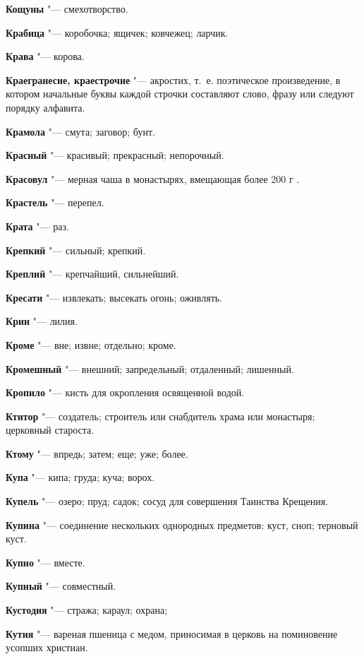 \begin{mymulticols}
\noindent\textbf{Кощуны} "--- смехотворство. 

\noindent\textbf{Крабица} "--- коробочка; ящичек; ковчежец; ларчик. 

\noindent\textbf{Крава} "--- корова. 

\noindent\textbf{Краегранесие, краестрочие} "--- акростих, т.~е. поэтическое произведение, в котором начальные буквы каждой строчки составляют слово, фразу или следуют порядку алфавита. 

\noindent\textbf{Крамола} "--- смута; заговор; бунт. 

\noindent\textbf{Красный} "--- красивый; прекрасный; непорочный. 

\noindent\textbf{Красовул} "--- мерная чаша в монастырях, вмещающая более 200 г . 

\noindent\textbf{Крастель} "--- перепел. 

\noindent\textbf{Крата} "--- раз. 

\noindent\textbf{Крепкий} "--- сильный; крепкий. 

\noindent\textbf{Креплий} "--- крепчайший, сильнейший. 

\noindent\textbf{Кресати} "--- извлекать; высекать огонь; оживлять. 

\noindent\textbf{Крин} "--- лилия. 

\noindent\textbf{Кроме} "--- вне; извне; отдельно; кроме. 

\noindent\textbf{Кромешный} "--- внешний; запредельный; отдаленный; лишенный. 

\noindent\textbf{Кропило} "--- кисть для окропления освященной водой. 

\noindent\textbf{Ктитор} "--- создатель; строитель или снабдитель храма или монастыря; церковный староста. 

\noindent\textbf{Ктому} "--- впредь; затем; еще; уже; более. 

\noindent\textbf{Купа} "--- кипа; груда; куча; ворох. 

\noindent\textbf{Купель} "--- озеро; пруд; садок; сосуд для совершения Таинства Крещения. 

\noindent\textbf{Купина} "--- соединение нескольких однородных предметов: куст, сноп; терновый куст. 

\noindent\textbf{Купно} "--- вместе. 

\noindent\textbf{Купный} "--- совместный. 

\noindent\textbf{Кустодия} "--- стража; караул; охрана; 

\noindent\textbf{Кутия} "--- вареная пшеница с медом, приносимая в церковь на поминовение усопших христиан. 


\end{mymulticols}
